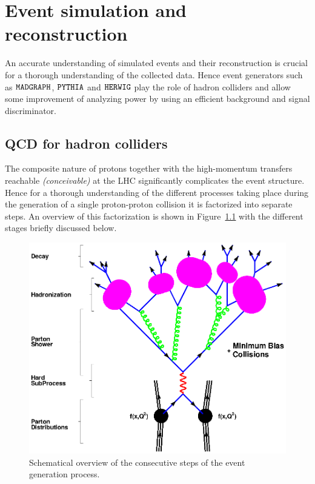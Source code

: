 \chapter{Event simulation and reconstruction} \label{chp:labelTitle}

An accurate understanding of simulated events and their reconstruction is crucial for a thorough understanding of the collected data. Hence event generators such as $\texttt{MADGRAPH}$, $\texttt{PYTHIA}$ and $\texttt{HERWIG}$ play the role of hadron colliders and allow some improvement of analyzing power by using an efficient background and signal discriminator.

\section{QCD for hadron colliders} \label{sec::QCDHadron}

The composite nature of protons together with the high-momentum transfers reachable \textit{(conceivable)} at the LHC significantly complicates the event structure. 
Hence for a thorough understanding of the different processes taking place during the generation of a single proton-proton collision it is factorized into separate steps.
An overview of this factorization is shown in Figure~\ref{fig::EvtShower} with the different stages briefly discussed below.

\begin{figure}[htb]
 \centering
 \includegraphics[width = 0.8 \textwidth]{Chapters/Chapter3/Figures/f_shg_event.eps}
 \caption{Schematical overview of the consecutive steps of the event generation process.}  \label{fig::EvtShower}
\end{figure}

